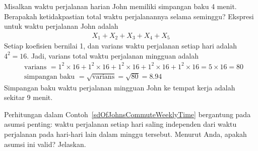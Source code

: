 \begin{examplewrap}
\begin{nexample}{Misalkan waktu perjalanan harian John memiliki simpangan baku 4 menit. Berapakah ketidakpastian total waktu perjalanannya selama seminggu?} \label{sdOfJohnsCommuteWeeklyTime}
Ekspresi untuk waktu perjalanan John adalah
\begin{align*}
X_1 + X_2 + X_3 + X_4 + X_5
\end{align*}
Setiap koefisien bernilai 1, dan varians waktu perjalanan setiap hari adalah $4^2=16$. Jadi, varians total waktu perjalanan mingguan adalah
\begin{align*}
&\text{varians }= 1^2 \times  16 + 1^2 \times  16 + 1^2 \times  16 + 1^2 \times  16 + 1^2 \times  16 = 5\times 16 = 80 \\
&\text{simpangan baku } = \sqrt{\text{varians}} = \sqrt{80} = 8.94
\end{align*}
Simpangan baku waktu perjalanan mingguan John ke tempat kerja adalah sekitar 9 menit.
\end{nexample}
\end{examplewrap}

\begin{exercisewrap}
\begin{nexercise}
Perhitungan dalam Contoh~\ref{sdOfJohnsCommuteWeeklyTime} bergantung pada asumsi penting: waktu perjalanan setiap hari saling independen dari waktu perjalanan pada hari-hari lain dalam minggu tersebut. Menurut Anda, apakah asumsi ini valid? Jelaskan.\footnotemark
\end{nexercise}
\end{exercisewrap}

